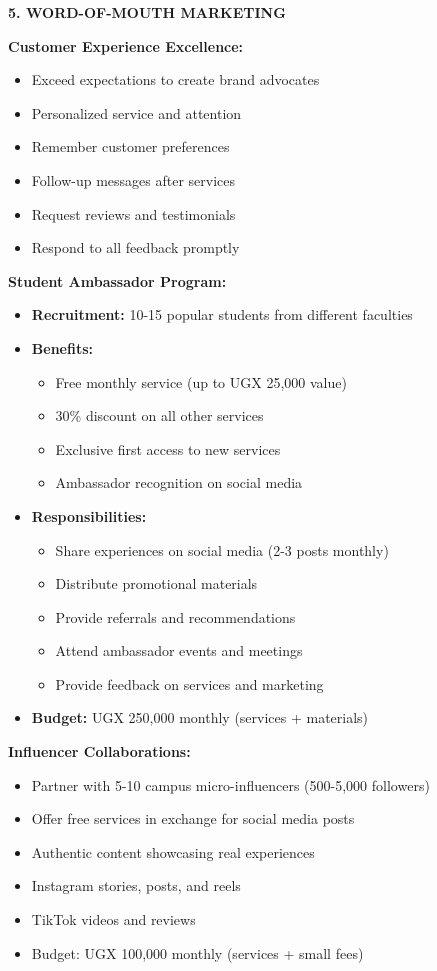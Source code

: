 \documentclass[a4paper,12pt]{article}
\begin{document}
\vspace{1em}

\textbf{5. WORD-OF-MOUTH MARKETING}

\textbf{Customer Experience Excellence:}
\begin{itemize}[leftmargin=2em]
    \item Exceed expectations to create brand advocates
    \item Personalized service and attention
    \item Remember customer preferences
    \item Follow-up messages after services
    \item Request reviews and testimonials
    \item Respond to all feedback promptly
\end{itemize}

\textbf{Student Ambassador Program:}
\begin{itemize}[leftmargin=2em]
    \item \textbf{Recruitment:} 10-15 popular students from different faculties
    \item \textbf{Benefits:}
    \begin{itemize}
        \item Free monthly service (up to UGX 25,000 value)
        \item 30\% discount on all other services
        \item Exclusive first access to new services
        \item Ambassador recognition on social media
    \end{itemize}
    \item \textbf{Responsibilities:}
    \begin{itemize}
        \item Share experiences on social media (2-3 posts monthly)
        \item Distribute promotional materials
        \item Provide referrals and recommendations
        \item Attend ambassador events and meetings
        \item Provide feedback on services and marketing
    \end{itemize}
    \item \textbf{Budget:} UGX 250,000 monthly (services + materials)
\end{itemize}

\textbf{Influencer Collaborations:}
\begin{itemize}[leftmargin=2em]
    \item Partner with 5-10 campus micro-influencers (500-5,000 followers)
    \item Offer free services in exchange for social media posts
    \item Authentic content showcasing real experiences
    \item Instagram stories, posts, and reels
    \item TikTok videos and reviews
    \item Budget: UGX 100,000 monthly (services + small fees)
\end{itemize}
\end{document}
